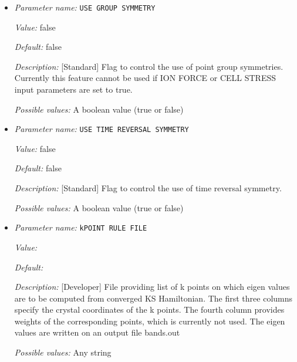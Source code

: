 \begin{itemize}
\item {\it Parameter name:} {\tt USE GROUP SYMMETRY}
\label{parameters:Brillouin zone k point sampling options/USE GROUP SYMMETRY}
\label{parameters:Brillouin_20zone_20k_20point_20sampling_20options/USE_20GROUP_20SYMMETRY}


{\it Value:} false


{\it Default:} false


{\it Description:} [Standard] Flag to control the use of point group symmetries. Currently this feature cannot be used if ION FORCE or CELL STRESS input parameters are set to true.


{\it Possible values:} A boolean value (true or false)
\item {\it Parameter name:} {\tt USE TIME REVERSAL SYMMETRY}
\label{parameters:Brillouin zone k point sampling options/USE TIME REVERSAL SYMMETRY}
\label{parameters:Brillouin_20zone_20k_20point_20sampling_20options/USE_20TIME_20REVERSAL_20SYMMETRY}


{\it Value:} false


{\it Default:} false


{\it Description:} [Standard] Flag to control the use of time reversal symmetry.


{\it Possible values:} A boolean value (true or false)
\item {\it Parameter name:} {\tt kPOINT RULE FILE}
\label{parameters:Brillouin zone k point sampling options/kPOINT RULE FILE}
\label{parameters:Brillouin_20zone_20k_20point_20sampling_20options/kPOINT_20RULE_20FILE}


{\it Value:} 


{\it Default:} 


{\it Description:} [Developer] File providing list of k points on which eigen values are to be computed from converged KS Hamiltonian. The first three columns specify the crystal coordinates of the k points. The fourth column provides weights of the corresponding points, which is currently not used. The eigen values are written on an output file bands.out


{\it Possible values:} Any string
\end{itemize}



